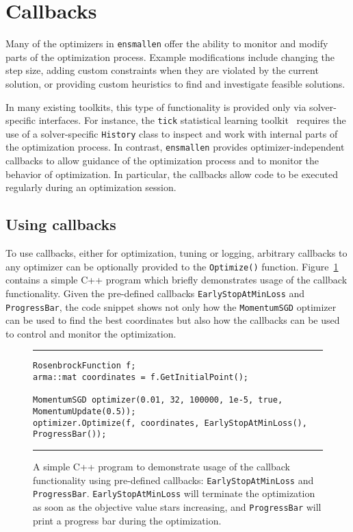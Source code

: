 \section{Callbacks}
\label{sec:callbacks}

Many of the optimizers in {\tt ensmallen} offer the ability to monitor
and modify parts of the optimization process.
Example modifications include changing the step size,
adding custom constraints when they are violated by the current solution,
or providing custom heuristics to find and investigate feasible solutions.

In many existing toolkits, this type of functionality is provided only via
solver-specific interfaces.  For instance, the {\tt tick} statistical learning
toolkit~\cite{bacry2017tick} requires the use of a solver-specific {\tt History}
class to inspect and work with internal parts of the optimization process.  In
contrast, {\tt ensmallen} provides optimizer-independent callbacks to allow
guidance of the optimization process and to monitor the behavior of
optimization.  In particular, the callbacks allow code to be
executed regularly during an optimization session.


\subsection{Using callbacks}

To use callbacks, either for optimization, tuning or logging, 
arbitrary callbacks to any optimizer can be optionally provided
to the {\tt Optimize()} function.
Figure~\ref{fig:example_prog_callbacks} contains a simple C++ program which
briefly demonstrates usage of the callback functionality.  Given the pre-defined
callbacks {\tt EarlyStopAtMinLoss} and {\tt ProgressBar}, the code snippet shows
not only how the {\tt MomentumSGD} optimizer can be used to find the best
coordinates but also how the callbacks can be used to control and monitor the
optimization.

\begin{figure}[t!]
\centering
\hrule
\vspace{1ex}
\begin{verbatim}
RosenbrockFunction f;
arma::mat coordinates = f.GetInitialPoint();

MomentumSGD optimizer(0.01, 32, 100000, 1e-5, true, MomentumUpdate(0.5));
optimizer.Optimize(f, coordinates, EarlyStopAtMinLoss(), ProgressBar());
\end{verbatim}
\hrule
\vspace*{-0.5em}
\caption
  {
  A simple C++ program to demonstrate usage of the callback functionality using
pre-defined callbacks: \texttt{EarlyStopAtMinLoss} and \texttt{ProgressBar}.
{\tt EarlyStopAtMinLoss} will terminate the optimization as soon as the
objective value stars increasing, and {\tt ProgressBar} will print a progress
bar during the optimization.
  }
\label{fig:example_prog_callbacks}
\end{figure}


